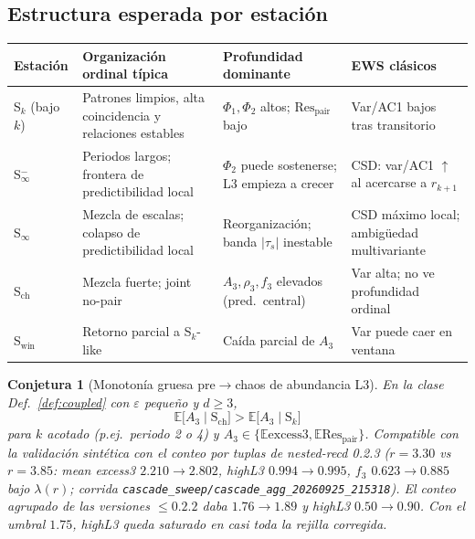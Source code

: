 \documentclass[11pt,a4paper]{article}
\theoremstyle{definition}
\theoremstyle{plain}
\newtheorem{conjecture}{Conjetura}[section]
\theoremstyle{remark}
\newcommand{\Res}{\mathrm{Res}}
\newcommand{\excess}{\mathrm{excess3}}
\newcommand{\ts}{\tau_s}
\begin{document}
\subsection{Estructura esperada por estaci\'on}

\begin{center}
\begin{tabular}{@{}p{}p{}p{}p{}@{}}
\toprule
Estaci\'on & Organizaci\'on ordinal t\'ipica & Profundidad dominante & EWS cl\'asicos \\
\midrule
S$_k$ (bajo $k$) &
Patrones limpios, alta coincidencia y relaciones estables &
$\Phi_1,\Phi_2$ altos; $\Res_{\mathrm{pair}}$ bajo &
Var/AC1 bajos tras transitorio \\
S$_\infty^-$ &
Periodos largos; frontera de predictibilidad local &
$\Phi_2$ puede sostenerse; L3 empieza a crecer &
CSD: var/AC1 $\uparrow$ al acercarse a $r_{k+1}$ \\
S$_\infty$ &
Mezcla de escalas; colapso de predictibilidad local &
Reorganizaci\'on; banda $|\ts|$ inestable &
CSD m\'aximo local; ambig\"uedad multivariante \\
S$_{\mathrm{ch}}$ &
Mezcla fuerte; joint no-pair &
$A_3,\rho_3,f_3$ elevados (pred.\ central) &
Var alta; no ve profundidad ordinal \\
S$_{\mathrm{win}}$ &
Retorno parcial a S$_k$-like &
Ca\'ida parcial de $A_3$ &
Var puede caer en ventana \\
\bottomrule
\end{tabular}
\end{center}

\begin{conjecture}[Monoton\'ia gruesa pre$\to$chaos de abundancia L3]
\label{conj:mono}
En la clase Def.~\ref{def:coupled} con $\varepsilon$ peque\~no y $d\ge 3$,
\begin{equation}
\mathbb{E}\bigl[A_3\mid\mathrm{S}_{\mathrm{ch}}\bigr]
>
\mathbb{E}\bigl[A_3\mid\mathrm{S}_{k}\bigr]
\end{equation}
para $k$ acotado (p.ej.\ periodo 2 o 4) y $A_3\in\{\mathbb{E}\excess,
\mathbb{E}\Res_{\mathrm{pair}}\}$. Compatible con la validaci\'on
sint\'etica con el conteo por tuplas de nested-recd 0.2.3
($r=3.30$ vs $r=3.85$: mean excess3 $2.210\to 2.802$, highL3
$0.994\to 0.995$, $f_3$ $0.623\to 0.885$ bajo $\lambda(r)$;
corrida \texttt{cascade\_sweep/cascade\_agg\_20260925\_215318}).
El conteo agrupado de las versiones $\le 0.2.2$ daba
$1.76\to 1.89$ y highL3 $0.50\to 0.90$. Con el umbral $1.75$,
highL3 queda saturado en casi toda la rejilla corregida.
\end{conjecture}
\end{document}
